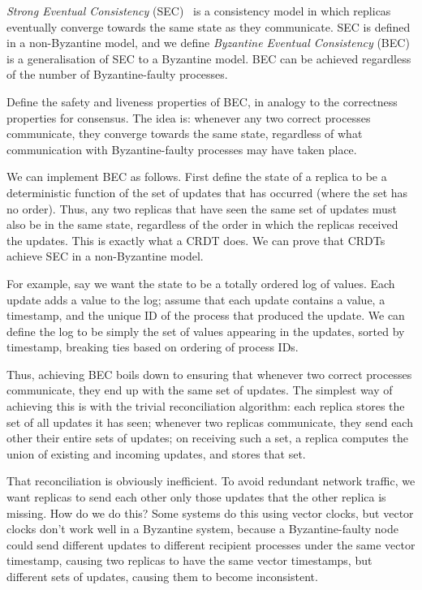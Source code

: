 \documentclass[manuscript]{acmart}
\begin{document}
\emph{Strong Eventual Consistency} (SEC)~\cite{Shapiro:2011un} is a consistency model in which replicas eventually converge towards the same state as they communicate.
SEC is defined in a non-Byzantine model, and we define \emph{Byzantine Eventual Consistency} (BEC) is a generalisation of SEC to a Byzantine model.
BEC can be achieved regardless of the number of Byzantine-faulty processes.

Define the safety and liveness properties of BEC, in analogy to the correctness properties for consensus.
The idea is: whenever any two correct processes communicate, they converge towards the same state, regardless of what communication with Byzantine-faulty processes may have taken place.

We can implement BEC as follows. First define the state of a replica to be a deterministic function of the set of updates that has occurred (where the set has no order).
Thus, any two replicas that have seen the same set of updates must also be in the same state, regardless of the order in which the replicas received the updates. This is exactly what a CRDT does.
We can prove that CRDTs achieve SEC in a non-Byzantine model.

For example, say we want the state to be a totally ordered log of values.
Each update adds a value to the log; assume that each update contains a value, a timestamp, and the unique ID of the process that produced the update.
We can define the log to be simply the set of values appearing in the updates, sorted by timestamp, breaking ties based on ordering of process IDs.

Thus, achieving BEC boils down to ensuring that whenever two correct processes communicate, they end up with the same set of updates.
The simplest way of achieving this is with the trivial reconciliation algorithm: each replica stores the set of all updates it has seen; whenever two replicas communicate, they send each other their entire sets of updates; on receiving such a set, a replica computes the union of existing and incoming updates, and stores that set.

That reconciliation is obviously inefficient. To avoid redundant network traffic, we want replicas to send each other only those updates that the other replica is missing.
How do we do this?
Some systems do this using vector clocks, but vector clocks don't work well in a Byzantine system, because a Byzantine-faulty node could send different updates to different recipient processes under the same vector timestamp, causing two replicas to have the same vector timestamps, but different sets of updates, causing them to become inconsistent.
\end{document}
